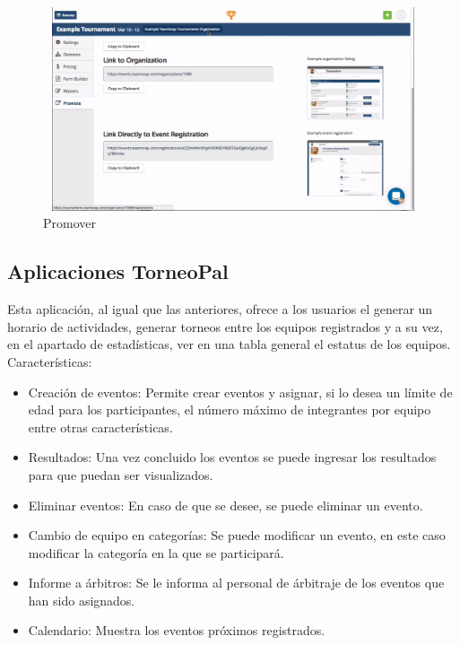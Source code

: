\begin{figure}[hbt]
	\centering
	\includegraphics[width=12cm, height=6cm]{Imagenes/Aplicaciones/TsT3.png}
	\caption{Promover}
\end{figure}
\pagebreak


\subsection{Aplicaciones TorneoPal}
\noindent Esta aplicación, al igual que las anteriores, ofrece a los usuarios el generar un horario de actividades, generar torneos entre los equipos registrados y a su vez, en el apartado de estadísticas, ver en una tabla general el estatus de los equipos. \cite{tp}
Características: 
\begin{itemize}
	\item Creación de eventos: Permite crear eventos y asignar, si lo desea un límite de edad para los participantes, el número máximo de integrantes por equipo entre otras características.
	\item Resultados: Una vez concluido los eventos se puede ingresar los resultados para que puedan ser visualizados.
	\item Eliminar eventos: En caso de que se desee, se puede eliminar un evento.
	\item Cambio de equipo en categorías: Se puede modificar un evento, en este caso modificar la categoría en la que se participará.
	\item Informe a árbitros: Se le informa al personal de árbitraje de los eventos que han sido asignados.
	\item Calendario: Muestra los eventos próximos registrados.
	
\end{itemize}
